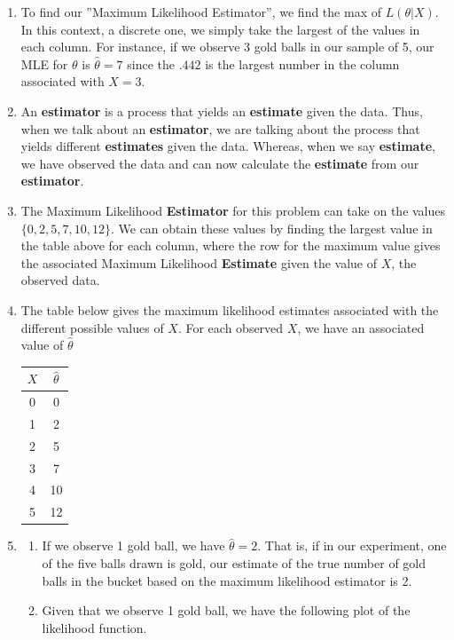 \documentclass[12pt]{article}\usepackage[]{graphicx}\usepackage[]{color}
\begin{document}
\begin{enumerate}
\item To find our ''Maximum Likelihood Estimator'', we find the max of $L(\theta | X)$. In this context, a discrete one, we simply take the largest of the values in each column. For instance, if we observe 3 gold balls in our sample of 5, our MLE for $\theta$ is $\hat{\theta} = 7$ since the $.442$ is the largest number in the column associated with $X = 3$.

\item An {\bf estimator} is a process that yields an {\bf estimate} given the data. Thus, when we talk about an {\bf estimator}, we are talking about the process that yields different {\bf estimates} given the data. Whereas, when we say {\bf estimate}, we have observed the data and can now calculate the {\bf estimate} from our {\bf estimator}.

\item The Maximum Likelihood {\bf Estimator} for this problem can take on the values $ \{0, 2, 5, 7, 10, 12 \}$. We can obtain these values by finding the largest value in the table above for each column, where the row for the maximum value gives the associated Maximum Likelihood {\bf Estimate} given the value of $X$, the observed data. 
\newpage

\item The table below gives the maximum likelihood estimates associated with the different possible values of $X$. For each observed $X$, we have an associated value of $\hat{\theta}$ \\

\begin{center}
\begin{tabular}{|c|c|}
\hline
$X$ & $\hat{\theta}$ \\
\hline
0 & 0\\
1 & 2\\
2 & 5\\
3 & 7\\
4 & 10\\
5 & 12\\
\hline
\end{tabular}
\end{center}

\item 
\begin{enumerate}[label=(\alph*)]
\item If we observe 1 gold ball, we have $\hat{\theta} = 2$. That is, if in our experiment, one of the five balls drawn is gold, our estimate of the true number of gold balls in the bucket based on the maximum likelihood estimator is 2.
\item
Given that we observe 1 gold ball, we have the following plot of the likelihood function. 


\end{enumerate}
\end{enumerate}
\end{document}
